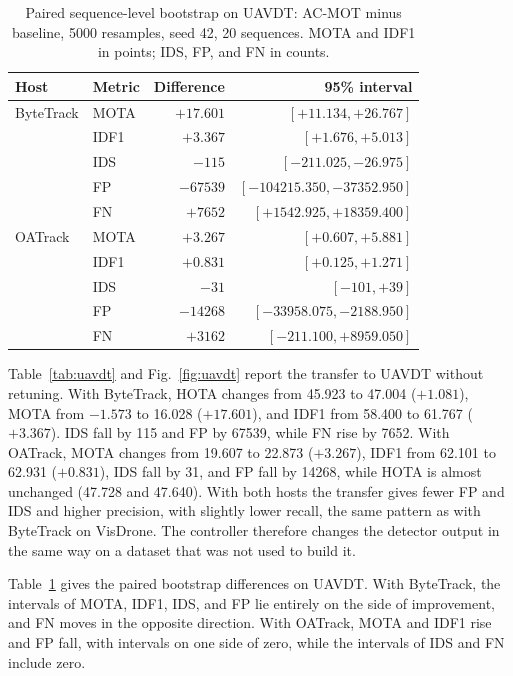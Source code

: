 \documentclass[pdflatex,sn-mathphys-num,iicol]{sn-jnl}
\begin{document}
\begin{table}[t]
\caption{Paired sequence-level bootstrap on UAVDT: AC-MOT minus baseline,
5000 resamples, seed 42, 20 sequences. MOTA and IDF1 in points; IDS, FP, and
FN in counts.}
\label{tab:uavdt-boot}
\centering\footnotesize
\setlength{\tabcolsep}{4pt}
\begin{tabular}{@{}llrr@{}}
\toprule
Host & Metric & Difference & 95\% interval\\
\midrule
ByteTrack & MOTA & $+17.601$ & $[+11.134, +26.767]$\\
 & IDF1 & $+3.367$ & $[+1.676, +5.013]$\\
 & IDS & $-115$ & $[-211.025, -26.975]$\\
 & FP & $-67539$ & $[-104215.350, -37352.950]$\\
 & FN & $+7652$ & $[+1542.925, +18359.400]$\\
\midrule
OATrack & MOTA & $+3.267$ & $[+0.607, +5.881]$\\
 & IDF1 & $+0.831$ & $[+0.125, +1.271]$\\
 & IDS & $-31$ & $[-101, +39]$\\
 & FP & $-14268$ & $[-33958.075, -2188.950]$\\
 & FN & $+3162$ & $[-211.100, +8959.050]$\\
\bottomrule
\end{tabular}
\end{table}

Table~\ref{tab:uavdt} and Fig.~\ref{fig:uavdt} report the transfer to UAVDT
without retuning. With ByteTrack, HOTA changes from 45.923 to 47.004 ($+1.081$),
MOTA from $-1.573$ to 16.028 ($+17.601$), and IDF1 from 58.400 to 61.767
($+3.367$). IDS fall by 115 and FP by 67539, while FN rise by 7652. With
OATrack, MOTA changes from 19.607 to 22.873 ($+3.267$), IDF1 from 62.101 to
62.931 ($+0.831$), IDS fall by 31, and FP fall by 14268, while HOTA is almost
unchanged (47.728 and 47.640). With both hosts the transfer gives fewer FP and
IDS and higher precision, with slightly lower recall, the same pattern as with
ByteTrack on VisDrone. The controller therefore changes the detector output in
the same way on a dataset that was not used to build it.

Table~\ref{tab:uavdt-boot} gives the paired bootstrap differences on UAVDT.
With ByteTrack, the intervals of MOTA, IDF1, IDS, and FP lie entirely on the
side of improvement, and FN moves in the opposite direction. With OATrack,
MOTA and IDF1 rise and FP fall, with intervals on one side of zero, while the
intervals of IDS and FN include zero.
\end{document}
